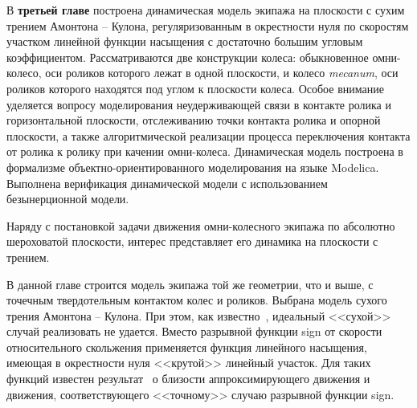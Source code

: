 
В \textbf{третьей главе} построена динамическая модель экипажа на плоскости с сухим трением Амонтона -- Кулона, регуляризованным в окрестности нуля по скоростям участком линейной функции насыщения с достаточно большим угловым коэффициентом. Рассматриваются две конструкции колеса: обыкновенное омни-колесо, оси роликов которого лежат в одной плоскости, и колесо \textit{mecanum}, оси роликов которого находятся под углом к плоскости колеса. Особое внимание уделяется вопросу моделирования неудерживающей связи в контакте ролика и горизонтальной плоскости, отслеживанию точки контакта ролика и опорной плоскости, а также алгоритмической реализации процесса переключения контакта от ролика к ролику при качении омни-колеса. Динамическая модель построена в формализме объектно-ориентированного моделирования на языке Modelica. Выполнена верификация динамической модели с использованием безынерционной модели.

%
Наряду с постановкой задачи движения омни-колесного экипажа по абсолютно шероховатой плоскости, интерес представляет его динамика на плоскости с трением.

В данной главе строится модель экипажа той же геометрии, что и выше,
 с точечным твердотельным контактом колес и роликов.
Выбрана модель сухого трения Амонтона -- Кулона. При этом, как известно~\cite{Novozhilov1991}, 
идеальный <<сухой>> случай реализовать не удается. Вместо разрывной функции 
sign от скорости относительного скольжения применяется функция линейного насыщения,
имеющая в окрестности нуля <<крутой>> линейный участок. Для таких функций известен 
результат~\cite{Novozhilov1991} о близости аппроксимирующего движения и движения, 
соответствующего <<точному>> случаю разрывной функции sign. 


